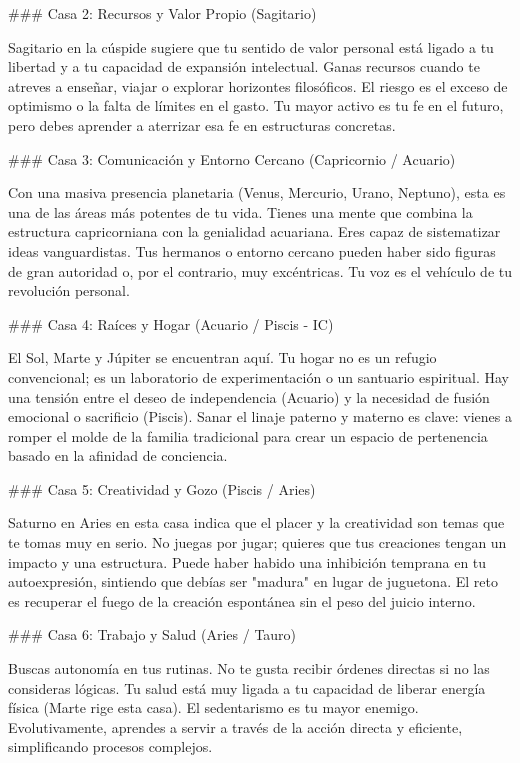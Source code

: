 ### Casa 2: Recursos y Valor Propio (Sagitario)

Sagitario en la cúspide sugiere que tu sentido de valor personal está ligado a tu libertad y a tu capacidad de expansión intelectual. Ganas recursos cuando te atreves a enseñar, viajar o explorar horizontes filosóficos. El riesgo es el exceso de optimismo o la falta de límites en el gasto. Tu mayor activo es tu fe en el futuro, pero debes aprender a aterrizar esa fe en estructuras concretas.

### Casa 3: Comunicación y Entorno Cercano (Capricornio / Acuario)

Con una masiva presencia planetaria (Venus, Mercurio, Urano, Neptuno), esta es una de las áreas más potentes de tu vida. Tienes una mente que combina la estructura capricorniana con la genialidad acuariana. Eres capaz de sistematizar ideas vanguardistas. Tus hermanos o entorno cercano pueden haber sido figuras de gran autoridad o, por el contrario, muy excéntricas. Tu voz es el vehículo de tu revolución personal.

### Casa 4: Raíces y Hogar (Acuario / Piscis - IC)

El Sol, Marte y Júpiter se encuentran aquí. Tu hogar no es un refugio convencional; es un laboratorio de experimentación o un santuario espiritual. Hay una tensión entre el deseo de independencia (Acuario) y la necesidad de fusión emocional o sacrificio (Piscis). Sanar el linaje paterno y materno es clave: vienes a romper el molde de la familia tradicional para crear un espacio de pertenencia basado en la afinidad de conciencia.

### Casa 5: Creatividad y Gozo (Piscis / Aries)

Saturno en Aries en esta casa indica que el placer y la creatividad son temas que te tomas muy en serio. No juegas por jugar; quieres que tus creaciones tengan un impacto y una estructura. Puede haber habido una inhibición temprana en tu autoexpresión, sintiendo que debías ser "madura" en lugar de juguetona. El reto es recuperar el fuego de la creación espontánea sin el peso del juicio interno.

### Casa 6: Trabajo y Salud (Aries / Tauro)

Buscas autonomía en tus rutinas. No te gusta recibir órdenes directas si no las consideras lógicas. Tu salud está muy ligada a tu capacidad de liberar energía física (Marte rige esta casa). El sedentarismo es tu mayor enemigo. Evolutivamente, aprendes a servir a través de la acción directa y eficiente, simplificando procesos complejos.

